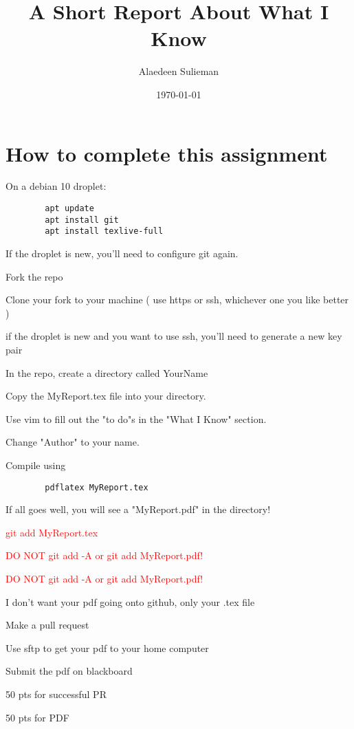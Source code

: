 \documentclass[11pt]{article}
\title{A Short Report About What I Know}
\author{ Alaedeen Sulieman }
\date{\today}
\begin{document}
\maketitle	

\section*{How to complete this assignment}
\begin{todolist}
    \item On a debian 10 droplet:
    \begin{verbatim}
        apt update
        apt install git
        apt install texlive-full
    \end{verbatim}
    \item If the droplet is new, you'll need to configure git again.
    \item Fork the repo
    \item Clone your fork to your machine ( use https or ssh, whichever one you like better )
    \item if the droplet is new and you want to use ssh, you'll need to generate a new key pair
    \item In the repo, create a directory called YourName
    \item Copy the MyReport.tex file into your directory.
    \item Use vim to fill out the "to do"s in the "What I Know" section.
    \item Change "Author" to your name.
    \item Compile using
    \begin{verbatim}
        pdflatex MyReport.tex
    \end{verbatim}
    \item If all goes well, you will see a "MyReport.pdf" in the directory!
    \item \textcolor{red}{ git add MyReport.tex}
    \item {\Large\textcolor{red}{ DO NOT git add -A or git add MyReport.pdf!}}
    \item {\LARGE\textcolor{red}{ DO NOT git add -A or git add MyReport.pdf!}}
    \item I don't want your pdf going onto github, only your .tex  file
    \item Make a pull request
    \item Use sftp to get your pdf to your home computer
    \item Submit the pdf on blackboard
    \item 50 pts for successful PR
    \item 50 pts for PDF
\end{todolist}
\end{document}
